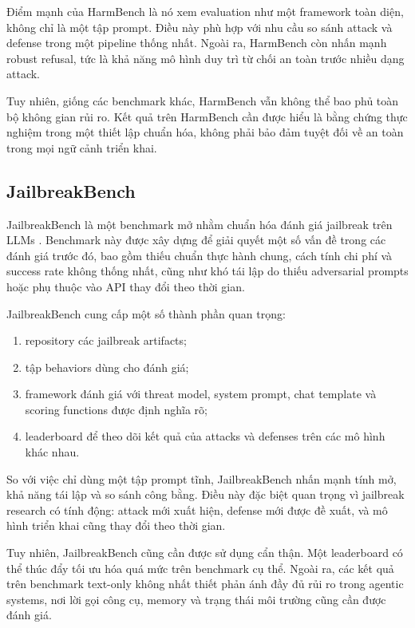 Điểm mạnh của HarmBench là nó xem evaluation như một framework toàn diện,
không chỉ là một tập prompt. Điều này phù hợp với nhu cầu so sánh attack
và defense trong một pipeline thống nhất. Ngoài ra, HarmBench còn nhấn
mạnh robust refusal, tức là khả năng mô hình duy trì từ chối an toàn trước
nhiều dạng attack.

Tuy nhiên, giống các benchmark khác, HarmBench vẫn không thể bao phủ toàn
bộ không gian rủi ro. Kết quả trên HarmBench cần được hiểu là bằng chứng
thực nghiệm trong một thiết lập chuẩn hóa, không phải bảo đảm tuyệt đối về
an toàn trong mọi ngữ cảnh triển khai.

\subsection{JailbreakBench}
\label{subsec:jailbreakbench}

JailbreakBench là một benchmark mở nhằm chuẩn hóa đánh giá jailbreak trên
LLMs \cite{chao2024jailbreakbench}. Benchmark này được xây dựng để giải
quyết một số vấn đề trong các đánh giá trước đó, bao gồm thiếu chuẩn thực
hành chung, cách tính chi phí và success rate không thống nhất, cũng như
khó tái lập do thiếu adversarial prompts hoặc phụ thuộc vào API thay đổi
theo thời gian.

JailbreakBench cung cấp một số thành phần quan trọng:

\begin{enumerate}[leftmargin=1.2cm]
    \item repository các jailbreak artifacts;
    \item tập behaviors dùng cho đánh giá;
    \item framework đánh giá với threat model, system prompt, chat template
    và scoring functions được định nghĩa rõ;
    \item leaderboard để theo dõi kết quả của attacks và defenses trên các
    mô hình khác nhau.
\end{enumerate}

So với việc chỉ dùng một tập prompt tĩnh, JailbreakBench nhấn mạnh tính mở,
khả năng tái lập và so sánh công bằng. Điều này đặc biệt quan trọng vì
jailbreak research có tính động: attack mới xuất hiện, defense mới được đề
xuất, và mô hình triển khai cũng thay đổi theo thời gian.

Tuy nhiên, JailbreakBench cũng cần được sử dụng cẩn thận. Một leaderboard
có thể thúc đẩy tối ưu hóa quá mức trên benchmark cụ thể. Ngoài ra, các
kết quả trên benchmark text-only không nhất thiết phản ánh đầy đủ rủi ro
trong agentic systems, nơi lời gọi công cụ, memory và trạng thái môi trường
cũng cần được đánh giá.

